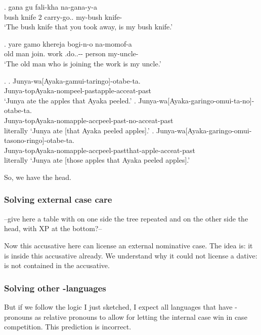 \exg. gana gu fali-kha  na-gana-y-a\\
 {bush knife} 2 carry-go.. my-{bush knife}-\\
 `The bush knife that you took away, is my bush knife.'

\exg. yare gamo khereja bogi-n-o  na-momof-a\\
 {old man} join. work .do..-- person my-uncle-\\
 `The old man who is joining the work is my uncle.'

\ex.
\ag. Junya-wa[Ayaka-gamui-taringo]-otabe-ta.\\
 Junya-topAyaka-nompeel-pastapple-acceat-past\\
 ‘Junya ate the apples that Ayaka peeled.’
\bg. Junya-wa[Ayaka-garingo-omui-ta-no]-otabe-ta.\\
 Junya-topAyaka-nomapple-accpeel-past-no-acceat-past\\
 literally ‘Junya ate [that Ayaka peeled apples].’
\bg. Junya-wa[Ayaka-garingo-omui-tasono-ringo]-otabe-ta.\\
 Junya-topAyaka-nomapple-accpeel-pastthat-apple-acceat-past\\
 literally ‘Junya ate [those apples that Ayaka peeled apples].’

So, we have the head.


\subsubsection{Solving external case care}

--give here a table with on one side the tree repeated and on the other side the head, with XP at the bottom?-- %

Now this accusative here can license an external nominative case. The idea is: it is inside this accusative already. We understand why it could not license a dative:  is not contained in the accusative.


\subsubsection{Solving other -languages}

But if we follow the logic I just sketched, I expect all languages that have -pronouns as relative pronouns to allow for letting the internal case win in case competition. This prediction is incorrect.

